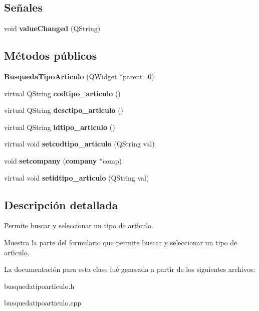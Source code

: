\subsection*{Se\~{n}ales}
\begin{CompactItemize}
\item 
void {\bf value\-Changed} (QString)\label{classBusquedaTipoArticulo_l0}

\end{CompactItemize}
\subsection*{M\'{e}todos p\'{u}blicos}
\begin{CompactItemize}
\item 
{\bf Busqueda\-Tipo\-Articulo} (QWidget $\ast$parent=0)\label{classBusquedaTipoArticulo_a0}

\item 
virtual QString {\bf codtipo\_\-articulo} ()\label{classBusquedaTipoArticulo_a1}

\item 
virtual QString {\bf desctipo\_\-articulo} ()\label{classBusquedaTipoArticulo_a2}

\item 
virtual QString {\bf idtipo\_\-articulo} ()\label{classBusquedaTipoArticulo_a3}

\item 
virtual void {\bf setcodtipo\_\-articulo} (QString val)\label{classBusquedaTipoArticulo_a4}

\item 
void {\bf setcompany} ({\bf company} $\ast$comp)\label{classBusquedaTipoArticulo_a5}

\item 
virtual void {\bf setidtipo\_\-articulo} (QString val)\label{classBusquedaTipoArticulo_a6}

\end{CompactItemize}


\subsection{Descripci\'{o}n detallada}
Permite buscar y seleccionar un tipo de art\'{\i}culo. 

Muestra la parte del formulario que permite buscar y seleccionar un tipo de art\'{\i}culo. 



La documentaci\'{o}n para esta clase fu\'{e} generada a partir de los siguientes archivos:\begin{CompactItemize}
\item 
busquedatipoarticulo.h\item 
busquedatipoarticulo.cpp\end{CompactItemize}
